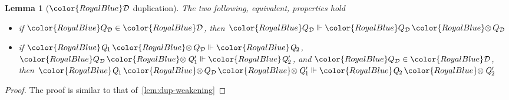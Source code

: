 \documentclass[acmsmall,usenames,dvipsnames,natbib=false,acmthm=false,screen]{acmart}
\newcommand{\constraintcolour}{\color{RoyalBlue}}
\newcommand{\constraintfont}[1]{{\constraintcolour#1}}
\newcommand{\constraintop}[1]{\mathop{\constraintfont{#1}}}
\newcommand{\qtensor}{\constraintop{\otimes}}
\theoremstyle{acmplain}
\newtheorem{lemma}[theorem]{Lemma}
\theoremstyle{acmdefinition}
\begin{document}
\begin{lemma}[$ \constraintfont{\mathcal{D} } $ duplication]
  \label{lem:dup-contraction}
  The two following, equivalent, properties hold
  \begin{itemize}
  \item if $  \constraintfont{ Q_{\mathcal{D} } }   \in  \constraintfont{\mathcal{D} } $, then $ \constraintfont{ Q_{\mathcal{D} } }   \Vdash   \constraintfont{ Q_{\mathcal{D} }  \qtensor  Q_{\mathcal{D} } } $
  \item if $ \constraintfont{ \ottnt{Q_{{\mathrm{1}}}}  \qtensor  Q_{\mathcal{D} } }   \Vdash   \constraintfont{ \ottnt{Q_{{\mathrm{2}}}} } $, $ \constraintfont{ Q_{\mathcal{D} }  \qtensor  \ottnt{Q'_{{\mathrm{1}}}} }   \Vdash   \constraintfont{ \ottnt{Q'_{{\mathrm{2}}}} } $, and
    $  \constraintfont{ Q_{\mathcal{D} } }   \in  \constraintfont{\mathcal{D} } $, then $ \constraintfont{ \ottnt{Q_{{\mathrm{1}}}}  \qtensor  Q_{\mathcal{D} }  \qtensor  \ottnt{Q'_{{\mathrm{1}}}} }   \Vdash   \constraintfont{ \ottnt{Q_{{\mathrm{2}}}}  \qtensor  \ottnt{Q'_{{\mathrm{2}}}} } $
  \end{itemize}
\end{lemma}
\begin{proof}
  The proof is similar to that of~\cref{lem:dup-weakening}
\end{proof}
\end{document}
